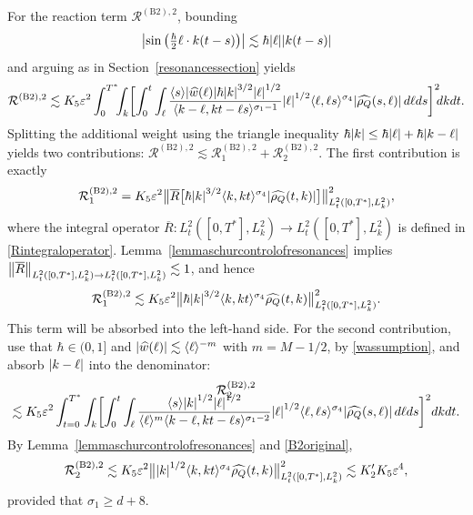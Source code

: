 \documentclass[JEP,XML,SOM,Unicode]{cedram}
\newcommand{\bnorm}[1]{\bigl\|#1\bigr\|}
\theoremstyle{plain}
\theoremstyle{remark}
\newcommand{\br}[1]{\left(#1\right)}
\newcommand{\ak}{\abs{k}}
\newcommand{\sbbr}[1]{\bigl[#1\bigr]}
\newcommand{\sbbbr}[1]{\biggl[#1\biggr]}
\newcommand{\jb}[1]{\langle#1\rangle}
\newcommand{\mytextfrac}[2]{{\textstyle\frac{#1}{#2}}}
\newcommand{\ep}{\varepsilon}
\begin{document}
For the reaction term $\mathcal{R}^{\mathrm{(B2),2}}$, bounding
\begin{align*}
\abs{\sin\br{\mytextfrac{\hbar}{2}\ell\cdot k(t-s)}}\lesssim\hbar\abs{\ell}\abs{k(t-s)}
\end{align*}
and arguing as in Section~\ref{resonancessection} yields
\begin{align*}
\mathcal{R}^{\mathrm{(B2),2}}\lesssim K_5\ep^2\int_{0}^{T^*}\hspace{-0.15cm}\int_k\sbbbr{\int_0^t\int_\ell\frac{\jb{s}\abs{\widehat w(\ell)}\hbar\ak^{3/2} \abs{\ell}^{1/2}}{\jb{k-\ell,kt-\ell s}^{\sigma_1-1}}\abs{\ell}^{1/2}\jb{\ell,\ell s}^{\sigma_4}\abs{\widehat{\rho_Q}(s,\ell)}\,d\ell ds}^2\hspace{-0.1cm}dkdt.
\end{align*}
Splitting the additional weight using the triangle inequality $\hbar\ak \leq \hbar\abs{\ell} + \hbar\abs{k - \ell}$ yields two contributions: $\mathcal{R}^{\mathrm{(B2),2}}\lesssim\mathcal{R}^{\mathrm{(B2),2}}_1+\mathcal{R}^{\mathrm{(B2),2}}_2$. The first contribution is exactly
\begin{align*}
\mathcal{R}^{\mathrm{(B2),2}}_1=K_5\ep^2\bnorm{\overline{R}\sbbr{\hbar\abs{k}^{3/2}\jb{k,kt}^{\sigma_4}\abs{\widehat{\rho_Q}(t,k)}}}_{L^2_{t}([0,T^*],L^2_k)}^2,
\end{align*}
where the integral operator $\overline R\colon L^2_{t}([0,T^*],L^2_k)\to L^2_{t}([0,T^*],L^2_k)$ is defined in \eqref{Rintegraloperator}. Lemma~\ref{lemmaschurcontrolofresonances} implies $\norm{\overline R}_{L^2_{t}([0,T^*],L^2_k)\to L^2_{t}([0,T^*],L^2_k)}\lesssim1$, and hence
\begin{align*}
\mathcal{R}^{\mathrm{(B2),2}}_1\lesssim K_5\ep^2\bnorm{\hbar\abs{k}^{3/2}\jb{k,kt}^{\sigma_4}\widehat{\rho_Q}(t,k)}_{L^2_{t}([0,T^*],L^2_k)}^2.
\end{align*} This term will be absorbed into the left-hand side. For the second contribution, use that $\hbar\in (0,1]$ and $\abs{\widehat w(\ell)}\lesssim\jb{\ell}^{-m}$ with $m=M-1/2$, by \eqref{wassumption}, and absorb $\abs{k-\ell}$ into the denominator:
\begin{multline*}
\mathcal{R}^{\mathrm{(B2),2}}_2\\[-8pt]
\lesssim K_5\ep^2\int_{t=0}^{T^*}\int_k\sbbbr{\int_0^t\int_\ell\frac{\jb{s}\ak^{1/2} \abs{\ell}^{1/2}}{\jb{\ell}^m\jb{k-\ell,kt-\ell s}^{\sigma_1-2}}\abs{\ell}^{1/2}\jb{\ell,\ell s}^{\sigma_4}\abs{\widehat{\rho_Q}(s,\ell)}\,d\ell ds}^2dkdt.
\end{multline*}
By Lemma~\ref{lemmaschurcontrolofresonances} and \eqref{B2original},
\begin{align*}
\mathcal{R}^{\mathrm{(B2),2}}_2\lesssim K_5\ep^2\bnorm{\abs{k}^{{1/2}}\jb{k,kt}^{\sigma_4}\widehat{\rho_Q}(t,k)}_{L^2_{t}([0,T^*],L^2_k)}^2\lesssim K_2'K_5\ep^4,
\end{align*}provided that $\sigma_1\geq d+8$.
\end{document}
